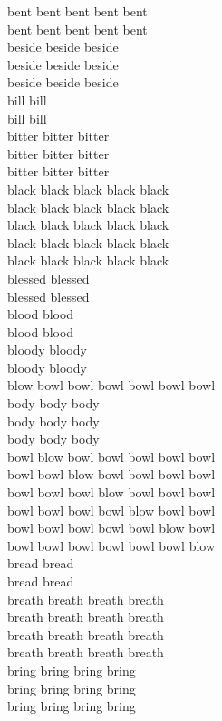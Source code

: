 bent bent bent bent bent\\
bent bent bent bent bent\\
beside beside beside\\
beside beside beside\\
beside beside beside\\
bill bill\\
bill bill\\
bitter bitter bitter\\
bitter bitter bitter\\
bitter bitter bitter\\
black black black black black\\
black black black black black\\
black black black black black\\
black black black black black\\
black black black black black\\
blessed blessed\\
blessed blessed\\
blood blood\\
blood blood\\
bloody bloody\\
bloody bloody\\
blow bowl bowl bowl bowl bowl bowl\\
body body body\\
body body body\\
body body body\\
bowl blow bowl bowl bowl bowl bowl\\
bowl bowl blow bowl bowl bowl bowl\\
bowl bowl bowl blow bowl bowl bowl\\
bowl bowl bowl bowl blow bowl bowl\\
bowl bowl bowl bowl bowl blow bowl\\
bowl bowl bowl bowl bowl bowl blow\\
bread bread\\
bread bread\\
breath breath breath breath\\
breath breath breath breath\\
breath breath breath breath\\
breath breath breath breath\\
bring bring bring bring\\
bring bring bring bring\\
bring bring bring bring\\
